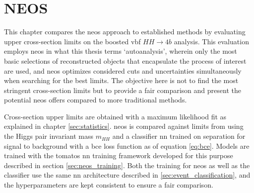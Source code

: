 \chapter{NEOS}














This chapter compares the \ac{neos} approach to established methods by evaluating upper cross-section limits on the boosted \ac{vbf} $HH\rightarrow4b$ analysis. This evaluation employs \ac{neos} in what this thesis terms `autoanalysis', wherein only the most basic selections of reconstructed objects that encapsulate the process of interest are used, and \ac{neos} optimizes considered cuts and uncertainties simultaneously when searching for the best limits. The objective here is not to find the most stringent cross-section limits but to provide a fair comparison and present the potential \ac{neos} offers compared to more traditional methods.

Cross-section upper limits are obtained with a maximum likelihood fit as explained in chapter \ref{sec:statistics}. \ac{neos} is compared against limits from using the Higgs pair invariant mass $m_{HH}$ and a classifier \ac{nn} trained on separation for signal to background with a \ac{bce} loss function as of equation \ref{eq:bce}. Models are trained with the \ac{tomatos} \ac{nn} training framework developed for this purpose \citep{tomatos} described in section \ref{sec:neos_training}. Both the training for \ac{neos} as well as the classifier use the same \ac{nn} architecture described in \ref{sec:event_classification}, and the hyperparameters are kept consistent to ensure a fair comparison.

